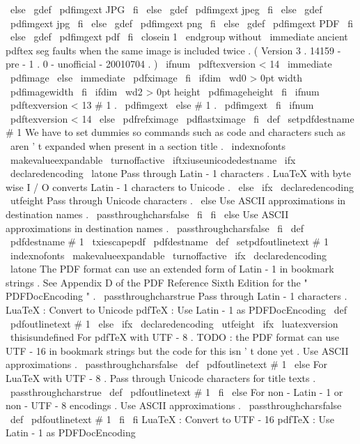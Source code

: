{{{}
%
\
else
\
gdef
\
pdfimgext
{
JPG
}
%
\
fi
\
else
\
gdef
\
pdfimgext
{
jpeg
}
%
\
fi
\
else
\
gdef
\
pdfimgext
{
jpg
}
%
\
fi
\
else
\
gdef
\
pdfimgext
{
png
}
%
\
fi
\
else
\
gdef
\
pdfimgext
{
PDF
}
%
\
fi
\
else
\
gdef
\
pdfimgext
{
pdf
}
%
\
fi
\
closein
1
\
endgroup
%
%
without
\
immediate
ancient
pdftex
seg
faults
when
the
same
image
is
%
included
twice
.
(
Version
3
.
14159
-
pre
-
1
.
0
-
unofficial
-
20010704
.
)
\
ifnum
\
pdftexversion
<
14
\
immediate
\
pdfimage
\
else
\
immediate
\
pdfximage
\
fi
\
ifdim
\
wd0
>
0pt
width
\
pdfimagewidth
\
fi
\
ifdim
\
wd2
>
0pt
height
\
pdfimageheight
\
fi
\
ifnum
\
pdftexversion
<
13
#
1
.
\
pdfimgext
\
else
{
#
1
.
\
pdfimgext
}
%
\
fi
\
ifnum
\
pdftexversion
<
14
\
else
\
pdfrefximage
\
pdflastximage
\
fi
}
%
\
def
\
setpdfdestname
#
1
{
{
%
%
We
have
to
set
dummies
so
commands
such
as
code
and
characters
%
such
as
\
aren
'
t
expanded
when
present
in
a
section
title
.
\
indexnofonts
\
makevalueexpandable
\
turnoffactive
\
iftxiuseunicodedestname
\
ifx
\
declaredencoding
\
latone
%
Pass
through
Latin
-
1
characters
.
%
LuaTeX
with
byte
wise
I
/
O
converts
Latin
-
1
characters
to
Unicode
.
\
else
\
ifx
\
declaredencoding
\
utfeight
%
Pass
through
Unicode
characters
.
\
else
%
Use
ASCII
approximations
in
destination
names
.
\
passthroughcharsfalse
\
fi
\
fi
\
else
%
Use
ASCII
approximations
in
destination
names
.
\
passthroughcharsfalse
\
fi
\
def
\
pdfdestname
{
#
1
}
%
\
txiescapepdf
\
pdfdestname
}
}
%
\
def
\
setpdfoutlinetext
#
1
{
{
%
\
indexnofonts
\
makevalueexpandable
\
turnoffactive
\
ifx
\
declaredencoding
\
latone
%
The
PDF
format
can
use
an
extended
form
of
Latin
-
1
in
bookmark
%
strings
.
See
Appendix
D
of
the
PDF
Reference
Sixth
Edition
for
%
the
"
PDFDocEncoding
"
.
\
passthroughcharstrue
%
Pass
through
Latin
-
1
characters
.
%
LuaTeX
:
Convert
to
Unicode
%
pdfTeX
:
Use
Latin
-
1
as
PDFDocEncoding
\
def
\
pdfoutlinetext
{
#
1
}
%
\
else
\
ifx
\
declaredencoding
\
utfeight
\
ifx
\
luatexversion
\
thisisundefined
%
For
pdfTeX
with
UTF
-
8
.
%
TODO
:
the
PDF
format
can
use
UTF
-
16
in
bookmark
strings
%
but
the
code
for
this
isn
'
t
done
yet
.
%
Use
ASCII
approximations
.
\
passthroughcharsfalse
\
def
\
pdfoutlinetext
{
#
1
}
%
\
else
%
For
LuaTeX
with
UTF
-
8
.
%
Pass
through
Unicode
characters
for
title
texts
.
\
passthroughcharstrue
\
def
\
pdfoutlinetext
{
#
1
}
%
\
fi
\
else
%
For
non
-
Latin
-
1
or
non
-
UTF
-
8
encodings
.
%
Use
ASCII
approximations
.
\
passthroughcharsfalse
\
def
\
pdfoutlinetext
{
#
1
}
%
\
fi
\
fi
%
LuaTeX
:
Convert
to
UTF
-
16
%
pdfTeX
:
Use
Latin
-
1
as
PDFDocEncoding
}}}

